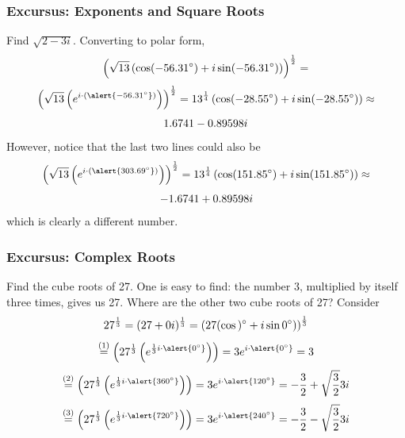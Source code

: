 \documentclass[xcolor=dvipsnames]{beamer}
\begin{document}
\begin{frame}
  \frametitle{Excursus: Exponents and Square Roots}
   Find $\sqrt{2-3i}$. Converting to polar form,
  \begin{equation}
    \label{eq:etahmohy}
    \left(\sqrt{13}\left(\cos(-56.31^{\circ})+i\sin(-56.31^{\circ})\right)\right)^{\frac{1}{2}}=\notag
  \end{equation}
  \begin{equation}
    \label{eq:thueceij}
    \left(\sqrt{13}\left(e^{i\cdot{}(\alert{-56.31^{\circ}})}\right)\right)^{\frac{1}{2}}=13^{\frac{1}{4}}\left(\cos(-28.55^{\circ})+i\sin(-28.55^{\circ})\right)\approx\notag
  \end{equation}
  \begin{equation}
    \label{eq:puxiengo}
    1.6741-0.89598i\notag
  \end{equation}
  However, notice that the last two lines could also be
  \begin{equation}
    \label{eq:guwohdoh}
    \left(\sqrt{13}\left(e^{i\cdot{}(\alert{303.69^{\circ}})}\right)\right)^{\frac{1}{2}}=13^{\frac{1}{4}}\left(\cos(151.85^{\circ})+i\sin(151.85^{\circ})\right)\approx\notag
  \end{equation}
  \begin{equation}
    \label{eq:jahwiebo}
    -1.6741+0.89598i\notag
  \end{equation}
  which is clearly a different number.
\end{frame}

\begin{frame}
  \frametitle{Excursus: Complex Roots}
 Find the cube roots of 27. One is easy to
find: the number 3, multiplied by itself three times, gives us 27.
Where are the other two cube roots of 27? Consider
\begin{equation}
  \label{eq:eecohghu}
  27^{\frac{1}{3}}=(27+0i)^{\frac{1}{3}}=\left(27(\cos{})^{\circ}+i\sin{}0^{\circ})\right)^{\frac{1}{3}}\notag
\end{equation}
\begin{equation}
  \label{eq:vuphahdo}
  \overset{(1)}{=}\left(27^{\frac{1}{3}}\left(e^{\frac{1}{3}i\cdot{}\alert{0^{\circ}}}\right)\right)=3e^{i\cdot{}\alert{0^{\circ}}}=3\notag
\end{equation}
\begin{equation}
  \label{eq:yudiesoo}
  \overset{(2)}{=}\left(27^{\frac{1}{3}}\left(e^{\frac{1}{3}i\cdot{}\alert{360^{\circ}}}\right)\right)=3e^{i\cdot{}\alert{120^{\circ}}}=-\frac{3}{2}+\sqrt{\frac{3}{2}}3i\notag
\end{equation}
\begin{equation}
  \label{eq:vaimetha}
  \overset{(3)}{=}\left(27^{\frac{1}{3}}\left(e^{\frac{1}{3}i\cdot{}\alert{720^{\circ}}}\right)\right)=3e^{i\cdot{}\alert{240^{\circ}}}=-\frac{3}{2}-\sqrt{\frac{3}{2}}3i\notag
\end{equation}
\end{frame}
\end{document}
